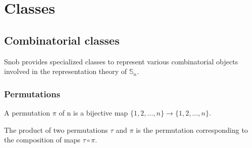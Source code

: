 \documentclass[letterpaper,10pt,english]{sphinxmanual}
\begin{document}
\begin{DUlineblock}{0em}
\item[] 
\end{DUlineblock}


\chapter{Classes}
\label{\detokenize{index:classes}}

\section{Combinatorial classes}
\label{\detokenize{index:combinatorial-classes}}
\sphinxAtStartPar
Snob provides specialized classes to represent various combinatorial objects involved in the
representation theory of \(\mathbb{S}_n\).


\subsection{Permutations}
\label{\detokenize{index:permutations}}
\sphinxAtStartPar
A permutation \(\pi\) of n is a bijective map \(\{1,2,\ldots,n\}\to\{1,2,\ldots,n\}\).

\begin{sphinxVerbatim}[commandchars=\\\{\}]
\PYG{p}{[}\PYG{p}{]}
\PYG{p}{[}\PYG{p}{]}
\end{sphinxVerbatim}

\sphinxAtStartPar
The product of two permutations \(\tau\) and \(\pi\) is the permutation corresponding
to the composition of maps \(\tau\circ\pi\).

\begin{sphinxVerbatim}[commandchars=\\\{\}]
\PYG{p}{[}\PYG{p}{]}
\end{sphinxVerbatim}
\end{document}
